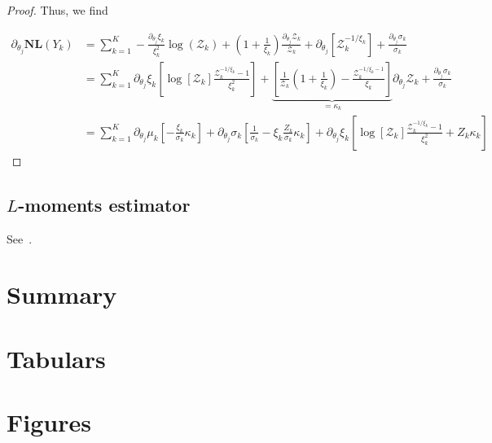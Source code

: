 \documentclass[12pt,a4paper]{article}
\theoremstyle{plain}
\theoremstyle{definition}
\theoremstyle{remark}
\newcommand{\zZ}{\mathcal{Z}}
\newcommand{\NL}{\mathbf{NL}}
\begin{document}
\begin{proof}
\noindent Thus, we find

\[
\begin{aligned}
\partial_{\theta_j}\NL(Y_k) & =\sum_{k=1}^K -
\frac{\partial_{\theta_j}\xi_k}{\xi_k^2}\log(\zZ_k) +
\left(1+\frac{1}{\xi_k}\right)\frac{\partial_{\theta_j}\zZ_k}{\zZ_k} + 
\partial_{\theta_j}\left[\zZ_k^{-1/\xi_k}\right] +
\frac{\partial_{\theta_j}\sigma_k}{\sigma_k} \\
&= \sum_{k=1}^K
\partial_{\theta_j}\xi_k\left[\log\left[\zZ_k\right]\frac{\zZ_{k}^{-1/\xi_k}-1}{\xi_k^2}\right] + 
\underbrace{\left[\frac{1}{\zZ_k}\left(1+\frac{1}{\xi_k}\right)-\frac{\zZ_k^{-1/\xi_k-1}}{\xi_k}\right]}_{=\kappa_k}
\partial_{\theta_j}\zZ_k+\frac{\partial_{\theta_j}\sigma_k}{\sigma_k}\\
&= \sum_{k=1}^K
\partial_{\theta_j}\mu_k\left[-\frac{\xi_k}{\sigma_k}\kappa_k\right] +
\partial_{\theta_j}\sigma_k\left[\frac{1}{\sigma_k}-{\xi_k}\frac{Z_k}{\sigma_k}\kappa_k\right] +
\partial_{\theta_j}\xi_k\left[\log\left[\zZ_k\right]\frac{\zZ_k^{-1/\xi_k}-1}{\xi_k^2}+Z_k\kappa_k\right]
\end{aligned}
\]

\end{proof}


\subsection{$L$-moments estimator} %

\noindent See~\citet{Hosking1985}.



\section*{Summary} %



\clearpage
\newpage
\pagebreak[4]

\appendix


\clearpage
\newpage
\pagebreak[4]
\printbibliography



\clearpage
\newpage
\pagebreak[4]


\section*{Tabulars} %

\clearpage
\newpage
\pagebreak[4]

\section*{Figures} %



\end{document}
